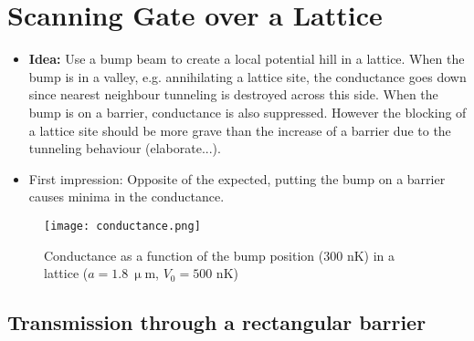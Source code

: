 \documentclass[11pt]{article}
\begin{document}
\section{Scanning Gate over a Lattice}
\begin{itemize}
	\item \textbf{Idea:} Use a bump beam to create a local potential hill in a lattice. When the bump is in a valley, e.g. annihilating a lattice site, the conductance goes down since nearest neighbour tunneling is destroyed across this side. When the bump is on a barrier, conductance is also suppressed. However the blocking of a lattice site should be more grave than the increase of a barrier due to the tunneling behaviour (elaborate...).
	\item First impression: Opposite of the expected, putting the bump on a barrier causes minima in the conductance. 
\end{itemize}


\begin{figure}
	\centering
		\texttt{[image: conductance.png]}
	\caption{Conductance as a function of the bump position (300 nK) in a lattice ($a=1.8\ \upmu$m, $V_0=500$ nK)}
	\label{fig:conductance}
\end{figure}

\subsection{Transmission through a rectangular barrier}
\end{document}

